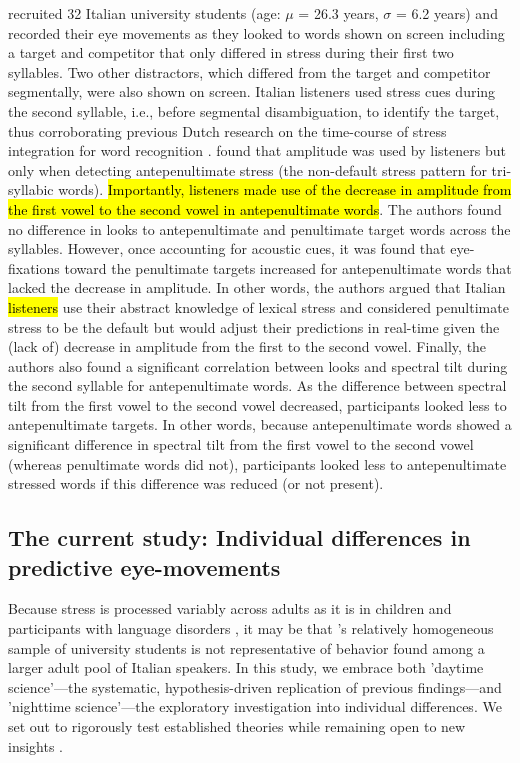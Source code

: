 \cite{Sulpizio_McQueen_2012} recruited 32 Italian university students (age: $\mu$ = 26.3 years, $\sigma$ = 6.2 years) and recorded their eye movements as they looked to words shown on screen including a target and competitor that only differed in stress during their first two syllables. Two other distractors, which differed from the target and competitor segmentally, were also shown on screen. Italian listeners used stress cues during the second syllable, i.e., before segmental disambiguation, to identify the target, thus corroborating previous Dutch research on the time-course of stress integration for word recognition \citep{Reinisch2010}. \cite{Sulpizio_McQueen_2012} found that amplitude was used by listeners but only when detecting antepenultimate stress (the non-default stress pattern for tri-syllabic words). \hl{Importantly, listeners made use of the decrease in amplitude from the first vowel to the second vowel in antepenultimate words}. The authors found no difference in looks to antepenultimate and penultimate target words across the syllables. However, once accounting for acoustic cues, it was found that eye-fixations toward the penultimate targets increased for antepenultimate words that lacked the decrease in amplitude. In other words, the authors argued that Italian \hl{listeners} use their abstract knowledge of lexical stress and considered penultimate stress to be the default but would adjust their predictions in real-time given the (lack of) decrease in amplitude from the first to the second vowel. Finally, the authors also found a significant correlation between looks and spectral tilt during the second syllable for antepenultimate words. As the difference between spectral tilt from the first vowel to the second vowel decreased, participants looked less to antepenultimate targets. In other words, because antepenultimate words showed a significant difference in spectral tilt from the first vowel to the second vowel (whereas penultimate words did not), participants looked less to antepenultimate stressed words if this difference was reduced (or not present). 



\subsection{The current study: Individual differences in predictive eye-movements}
Because stress is processed variably across adults as it is in children \citep[e.g.,][]{Colombo2014} and participants with language disorders \citep[e.g.,][]{Cappa1997}, it may be that \cite{Sulpizio_McQueen_2012}'s relatively homogeneous sample of university students is not representative of behavior found among a larger adult pool of Italian speakers. In this study, we embrace both 'daytime science'—the systematic, hypothesis-driven replication of previous findings—and 'nighttime science'—the exploratory investigation into individual differences. We set out to rigorously test established theories while remaining open to new insights \citep{Yanai2020}.

